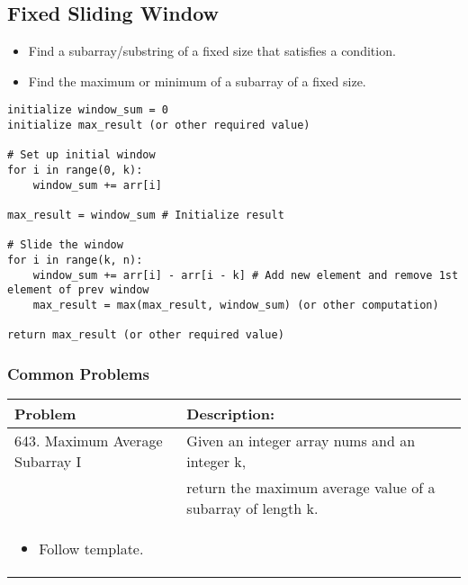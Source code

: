\subsection{Fixed Sliding Window}
\begin{summary}
    \begin{itemize}
        \item Find a subarray/substring of a fixed size that satisfies a condition.
        \item Find the maximum or minimum of a subarray of a fixed size.
    \end{itemize}
\end{summary}

\begin{algo}
    \begin{lstlisting}
initialize window_sum = 0
initialize max_result (or other required value)

# Set up initial window
for i in range(0, k):
    window_sum += arr[i]

max_result = window_sum # Initialize result

# Slide the window 
for i in range(k, n):
    window_sum += arr[i] - arr[i - k] # Add new element and remove 1st element of prev window
    max_result = max(max_result, window_sum) (or other computation)

return max_result (or other required value)
    \end{lstlisting}
\end{algo}

\subsubsection{Common Problems}
\begin{summary}
    \begin{center}
        \begin{tabular}{ll}
            \toprule
            \textbf{Problem} & \textbf{Description:} \\
            \midrule
            643. Maximum Average Subarray I & Given an integer array nums and an integer k, \\
            & return the maximum average value of a subarray of length k. \\
            \multicolumn{2}{p{\linewidth}}{
                \begin{itemize}
                    \item Follow template. 
                \end{itemize}
            } \\
            \bottomrule
        \end{tabular}
    \end{center}
\end{summary}
\newpage

